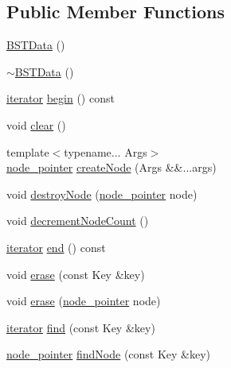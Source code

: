 \subsection*{Public Member Functions}
\begin{DoxyCompactItemize}
\item 
\hyperlink{structprism_1_1_b_s_t_data_a1b8209d72c9f9d20af5cd9a3437b1e31}{B\+S\+T\+Data} ()
\item 
\hyperlink{structprism_1_1_b_s_t_data_a81aec41313ed886f7a644426e0fbb085}{$\sim$\+B\+S\+T\+Data} ()
\item 
\hyperlink{structprism_1_1_b_s_t_data_a45bbf30d426440d4c346529f898b840c}{iterator} \hyperlink{structprism_1_1_b_s_t_data_a54d85dcf54692e74cbf0a3987c31cab5}{begin} () const 
\item 
void \hyperlink{structprism_1_1_b_s_t_data_a2537da968412165d17c4e4b96cda6a35}{clear} ()
\item 
{\footnotesize template$<$typename... Args$>$ }\\\hyperlink{structprism_1_1_b_s_t_node}{node\+\_\+pointer} \hyperlink{structprism_1_1_b_s_t_data_ae962d4b902646a46ca9394807a4fcfdd}{create\+Node} (Args \&\&...args)
\item 
void \hyperlink{structprism_1_1_b_s_t_data_a5a1650da477520956d376d76c246109b}{destroy\+Node} (\hyperlink{structprism_1_1_b_s_t_node}{node\+\_\+pointer} node)
\item 
void \hyperlink{structprism_1_1_b_s_t_data_abb77a6927e5acadc24ce02c151ce7689}{decrement\+Node\+Count} ()
\item 
\hyperlink{structprism_1_1_b_s_t_data_a45bbf30d426440d4c346529f898b840c}{iterator} \hyperlink{structprism_1_1_b_s_t_data_a0e48ef085fdd00273752b145fe4c1b08}{end} () const 
\item 
void \hyperlink{structprism_1_1_b_s_t_data_acd7c184bc02a244c67b983465be72a21}{erase} (const Key \&key)
\item 
void \hyperlink{structprism_1_1_b_s_t_data_a652a5f6f0936ce186ccd9c282ecf7ec6}{erase} (\hyperlink{structprism_1_1_b_s_t_node}{node\+\_\+pointer} node)
\item 
\hyperlink{structprism_1_1_b_s_t_data_a45bbf30d426440d4c346529f898b840c}{iterator} \hyperlink{structprism_1_1_b_s_t_data_ae4cec2adf1600132604e17aa1fc5a872}{find} (const Key \&key)
\item 
\hyperlink{structprism_1_1_b_s_t_node}{node\+\_\+pointer} \hyperlink{structprism_1_1_b_s_t_data_a220dbf271545ae3163b22a7e0403c397}{find\+Node} (const Key \&key)
\item 

\end{DoxyCompactItemize}
